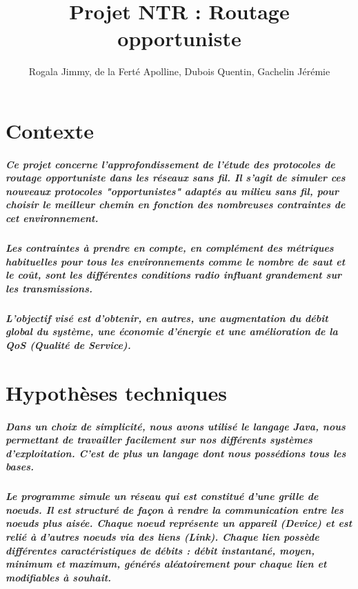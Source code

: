 \documentclass{report}
\title{Projet NTR : Routage opportuniste}
\author{Rogala Jimmy, de la Ferté Apolline, Dubois Quentin, Gachelin Jérémie}
\date{}
\begin{document}
\maketitle


\chapter{Contexte}

\paragraph{Ce projet concerne l'approfondissement de l'étude des protocoles de 
routage opportuniste dans les réseaux sans fil. Il s'agit de simuler ces nouveaux protocoles "opportunistes" adaptés au milieu sans fil, pour choisir le meilleur chemin en fonction des nombreuses contraintes de cet environnement.}

\paragraph{Les contraintes à prendre en compte, en complément des métriques habituelles pour tous les environnements comme le nombre de saut et le coût, sont les différentes conditions radio influant grandement sur les transmissions.}

\paragraph{L'objectif visé est d'obtenir, en autres, une augmentation du débit global du système, une économie d'énergie et une amélioration de la QoS (Qualité de Service).}

\chapter{Hypothèses techniques}

\paragraph{Dans un choix de simplicité, nous avons utilisé le langage Java, nous permettant de travailler facilement sur nos différents systèmes d'exploitation. C'est de plus un langage dont nous possédions tous les bases.}

\paragraph{Le programme simule un réseau qui est constitué d'une grille de noeuds. Il est structuré de façon à rendre la communication entre les noeuds plus aisée. Chaque noeud représente un appareil (Device) et est relié à d'autres noeuds via des liens (Link). Chaque lien possède différentes caractéristiques de débits : débit instantané, moyen, minimum et maximum, générés aléatoirement pour chaque lien et modifiables à souhait.}
\end{document}
